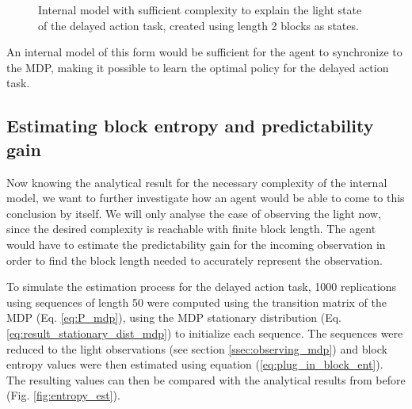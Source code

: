 \documentclass[12pt,a4paper]{article}
\begin{document}
\begin{figure}[H]
    \hspace{2cm}
    \caption{\label{fig:mp1_L2} Internal model with sufficient complexity to explain the light state of the delayed action task, created using length 2 blocks as states.}
\end{figure}

An internal model of this form would be sufficient for the agent to synchronize to the MDP, making it possible to learn the optimal policy for the delayed action task.

\subsection{Estimating block entropy and predictability gain}
Now knowing the analytical result for the necessary complexity of the internal model, we want to further investigate how an agent would be able to come to this conclusion by itself.
We will only analyse the case of observing the light now, since the desired complexity is reachable with finite block length.
The agent would have to estimate the predictability gain for the incoming observation in order to find the block length needed to accurately represent the observation.

To simulate the estimation process for the delayed action task, 1000 replications using sequences of length 50 were computed using the transition matrix of the MDP (Eq. \ref{eq:P_mdp}), using the MDP stationary distribution (Eq. \ref{eq:result_stationary_dist_mdp}) to initialize each sequence.
The sequences were reduced to the light observations (see section \ref{ssec:observing_mdp}) and block entropy values were then estimated using equation (\ref{eq:plug_in_block_ent}).
The resulting values can then be compared with the analytical results from before (Fig. \ref{fig:entropy_est}).
\end{document}

